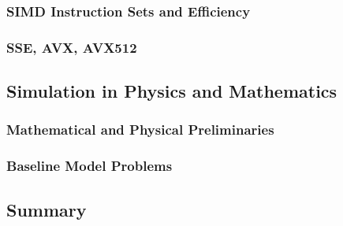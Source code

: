 \documentclass[crop=false]{standalone}
\begin{document}

      \subsubsection{SIMD Instruction Sets and Efficiency} %
      \label{ssub:simd_instruction_sets_and_efficiency}


      \subsubsection{SSE, AVX, AVX512} %
      \label{ssub:sse_avx_avx512}


    \subsection{Simulation in Physics and Mathematics} %
    \label{sub:simulation_in_physics_and_mathematics}
      \subsubsection{Mathematical and Physical Preliminaries} %
      \label{ssub:mathematical_and_physical_preliminaries}


      \subsubsection{Baseline Model Problems} %
      \label{ssub:baseline_model_problems}


    \subsection{Summary} %
    \label{sub:summary}

\end{document}
